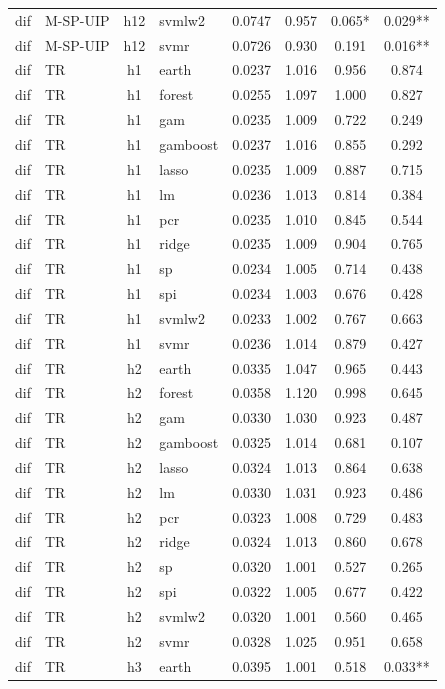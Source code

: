 \begin{ThreePartTable}
\begin{longtable}[t]{llclcccc}
dif & M-SP-UIP & h12 & svmlw2 & 0.0747 & 0.957 & 0.065* & 0.029**\\
dif & M-SP-UIP & h12 & svmr & 0.0726 & 0.930 & 0.191 & 0.016**\\
\addlinespace
dif & TR & h1 & earth & 0.0237 & 1.016 & 0.956 & 0.874\\
dif & TR & h1 & forest & 0.0255 & 1.097 & 1.000 & 0.827\\
dif & TR & h1 & gam & 0.0235 & 1.009 & 0.722 & 0.249\\
dif & TR & h1 & gamboost & 0.0237 & 1.016 & 0.855 & 0.292\\
dif & TR & h1 & lasso & 0.0235 & 1.009 & 0.887 & 0.715\\
dif & TR & h1 & lm & 0.0236 & 1.013 & 0.814 & 0.384\\
dif & TR & h1 & pcr & 0.0235 & 1.010 & 0.845 & 0.544\\
dif & TR & h1 & ridge & 0.0235 & 1.009 & 0.904 & 0.765\\
dif & TR & h1 & sp & 0.0234 & 1.005 & 0.714 & 0.438\\
dif & TR & h1 & spi & 0.0234 & 1.003 & 0.676 & 0.428\\
dif & TR & h1 & svmlw2 & 0.0233 & 1.002 & 0.767 & 0.663\\
dif & TR & h1 & svmr & 0.0236 & 1.014 & 0.879 & 0.427\\
\addlinespace
dif & TR & h2 & earth & 0.0335 & 1.047 & 0.965 & 0.443\\
dif & TR & h2 & forest & 0.0358 & 1.120 & 0.998 & 0.645\\
dif & TR & h2 & gam & 0.0330 & 1.030 & 0.923 & 0.487\\
dif & TR & h2 & gamboost & 0.0325 & 1.014 & 0.681 & 0.107\\
dif & TR & h2 & lasso & 0.0324 & 1.013 & 0.864 & 0.638\\
dif & TR & h2 & lm & 0.0330 & 1.031 & 0.923 & 0.486\\
dif & TR & h2 & pcr & 0.0323 & 1.008 & 0.729 & 0.483\\
dif & TR & h2 & ridge & 0.0324 & 1.013 & 0.860 & 0.678\\
dif & TR & h2 & sp & 0.0320 & 1.001 & 0.527 & 0.265\\
dif & TR & h2 & spi & 0.0322 & 1.005 & 0.677 & 0.422\\
dif & TR & h2 & svmlw2 & 0.0320 & 1.001 & 0.560 & 0.465\\
dif & TR & h2 & svmr & 0.0328 & 1.025 & 0.951 & 0.658\\
\addlinespace
dif & TR & h3 & earth & 0.0395 & 1.001 & 0.518 & 0.033**\\

\end{longtable}
\end{ThreePartTable}
